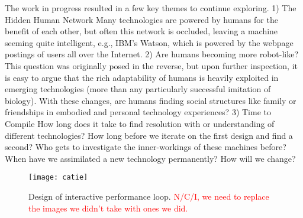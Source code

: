\documentclass[arts,article,submit,moreauthors,pdftex,10pt,a4paper]{mdpi}
\begin{document}
The work in progress resulted in a few key themes to continue exploring.  1) The Hidden Human Network Many technologies are powered by humans for the benefit of each other, but often this network is occluded, leaving a machine seeming quite intelligent, e.g., IBM’s Watson, which is powered by the webpage postings of users all over the Internet.  2) Are humans becoming more robot-like? This question was originally posed in the reverse, but upon further inspection, it is easy to argue that the rich adaptability of humans is heavily exploited in emerging technologies (more than any particularly successful imitation of biology).  With these changes, are humans finding social structures like family or friendships in embodied and personal technology experiences?  3) Time to Compile How long does it take to find resolution with or understanding of different technologies?  How long before we iterate on the first design and find a second?  Who gets to investigate the inner-workings of these machines before?  When have we assimilated a new technology permanently? How will we change?


\begin{figure}[h!]
\centering
\vspace{-.1in}
\texttt{[image: catie]}
\caption{Design of interactive performance loop.  \textcolor{red}{N/C/I, we need to replace the images we didn't take with ones we did.}}
\label{catie}
\end{figure}
\end{document}
